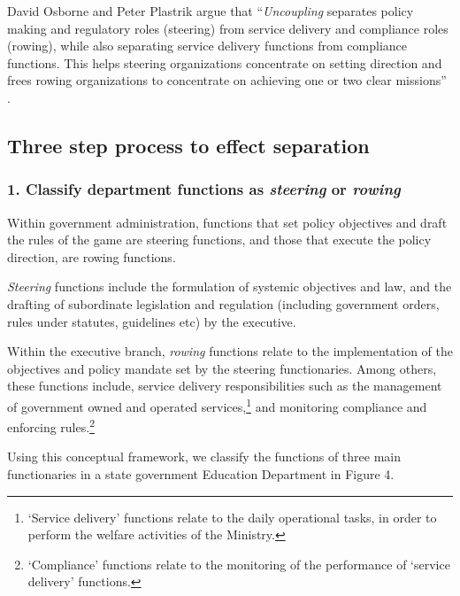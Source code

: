 \documentclass[a4paper, 12pt, twoside]{article}
\begin{document}
David Osborne and Peter Plastrik argue that “\textit{Uncoupling} separates policy making and regulatory roles (steering) from service delivery and compliance roles (rowing), while also separating service delivery functions from compliance functions. This helps steering organizations concentrate on setting direction and frees rowing organizations to concentrate on achieving one or two clear missions” \parencite{uncoupling}. 

\newpage
\subsection*{Three step process to effect separation}
\subsubsection*{1. Classify department functions as \textit{steering} or \textit{rowing}} 

Within government administration, functions that set policy objectives and draft the rules of the game are steering functions, and those that execute the policy direction, are rowing functions.

\textit{Steering} functions include the formulation of systemic objectives and law, and the drafting of subordinate legislation and regulation (including government orders, rules under statutes, guidelines etc) by the executive. 

Within the executive branch, \textit{rowing} functions relate to the implementation of the objectives and policy mandate set by the steering functionaries. Among others, these functions include, service delivery responsibilities such as the management of government owned and operated services,\footnote{‘Service delivery’ functions relate to the daily operational tasks, in order to perform the welfare activities of the Ministry.} and monitoring compliance and enforcing rules.\footnote{‘Compliance’ functions relate to the monitoring of the performance of ‘service delivery’ functions.} 

Using this conceptual framework, we classify the functions of three main functionaries in a state government Education Department in Figure 4.
\end{document}
